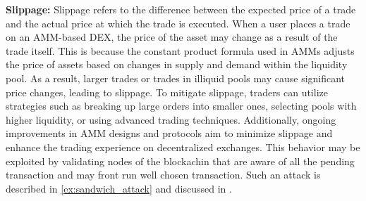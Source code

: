 \textbf{Slippage: }Slippage refers to the difference between the expected price of a trade and the actual price at which the trade is executed. When a user places a trade on an AMM-based DEX, the price of the asset may change as a result of the trade itself. This is because the constant product formula used in AMMs adjusts the price of assets based on changes in supply and demand within the liquidity pool. As a result, larger trades or trades in illiquid pools may cause significant price changes, leading to slippage. To mitigate slippage, traders can utilize strategies such as breaking up large orders into smaller ones, selecting pools with higher liquidity, or using advanced trading techniques. Additionally, ongoing improvements in AMM designs and protocols aim to minimize slippage and enhance the trading experience on decentralized exchanges. This behavior may be exploited by validating nodes of the blockachin that are aware of all the pending transaction and may front run well chosen transaction. Such an attack is described in \cref{ex:sandwich_attack} and discussed in \citet{Park2023}.


